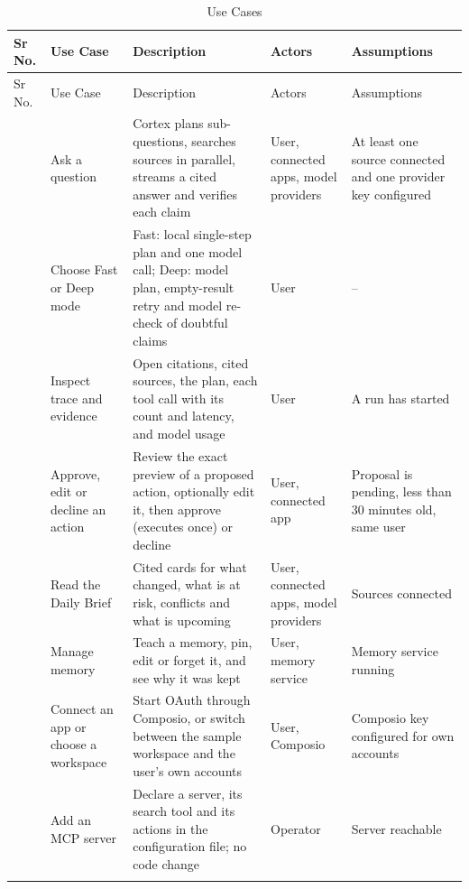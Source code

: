 \documentclass[oneside,a4paper,12pt]{report}
\begin{document}
{\small
\def\arraystretch{1.3}
\setlength{\tabcolsep}{4pt}
\begin{longtable}{| >{\centering\arraybackslash}p{0.9cm} | >{\raggedright\arraybackslash}p{2.3cm} | >{\raggedright\arraybackslash}p{4.3cm} | >{\raggedright\arraybackslash}p{2.2cm} | >{\raggedright\arraybackslash}p{2.5cm} |}
\hline
Sr No. & Use Case & Description & Actors & Assumptions \\ \hline
\endfirsthead
\hline
Sr No. & Use Case & Description & Actors & Assumptions \\ \hline
\endhead
1 & Ask a question & Cortex plans sub-questions, searches sources in parallel, streams a cited answer and verifies each claim & User, connected apps, model providers & At least one source connected and one provider key configured \\ \hline
2 & Choose Fast or Deep mode & Fast: local single-step plan and one model call; Deep: model plan, empty-result retry and model re-check of doubtful claims & User & -- \\ \hline
3 & Inspect trace and evidence & Open citations, cited sources, the plan, each tool call with its count and latency, and model usage & User & A run has started \\ \hline
4 & Approve, edit or decline an action & Review the exact preview of a proposed action, optionally edit it, then approve (executes once) or decline & User, connected app & Proposal is pending, less than 30 minutes old, same user \\ \hline
5 & Read the Daily Brief & Cited cards for what changed, what is at risk, conflicts and what is upcoming & User, connected apps, model providers & Sources connected \\ \hline
6 & Manage memory & Teach a memory, pin, edit or forget it, and see why it was kept & User, memory service & Memory service running \\ \hline
7 & Connect an app or choose a workspace & Start OAuth through Composio, or switch between the sample workspace and the user's own accounts & User, Composio & Composio key configured for own accounts \\ \hline
8 & Add an MCP server & Declare a server, its search tool and its actions in the configuration file; no code change & Operator & Server reachable \\ \hline
\caption{Use Cases}\label{tab:usecase}
\end{longtable}}
\end{document}
